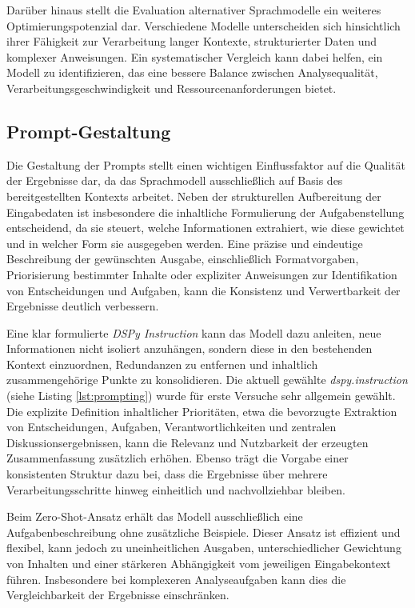Darüber hinaus stellt die Evaluation alternativer Sprachmodelle ein weiteres Optimierungspotenzial dar. Verschiedene Modelle unterscheiden sich hinsichtlich ihrer Fähigkeit zur Verarbeitung langer Kontexte, strukturierter Daten und komplexer Anweisungen. Ein systematischer Vergleich kann dabei helfen, ein Modell zu identifizieren, das eine bessere Balance zwischen Analysequalität, Verarbeitungsgeschwindigkeit und Ressourcenanforderungen bietet.

\newpage
\subsection{Prompt-Gestaltung}
Die Gestaltung der Prompts stellt einen wichtigen Einflussfaktor auf die Qualität der Ergebnisse dar, da das Sprachmodell ausschließlich auf Basis des bereitgestellten Kontexts arbeitet. Neben der strukturellen Aufbereitung der Eingabedaten ist insbesondere die inhaltliche Formulierung der Aufgabenstellung entscheidend, da sie steuert, welche Informationen extrahiert, wie diese gewichtet und in welcher Form sie ausgegeben werden. Eine präzise und eindeutige Beschreibung der gewünschten Ausgabe, einschließlich Formatvorgaben, Priorisierung bestimmter Inhalte oder expliziter Anweisungen zur Identifikation von Entscheidungen und Aufgaben, kann die Konsistenz und Verwertbarkeit der Ergebnisse deutlich verbessern.

Eine klar formulierte \textit{DSPy Instruction} kann das Modell dazu anleiten, neue Informationen nicht isoliert anzuhängen, sondern diese in den bestehenden Kontext einzuordnen, Redundanzen zu entfernen und inhaltlich zusammengehörige Punkte zu konsolidieren. Die aktuell gewählte \textit{dspy.instruction} (siehe Listing \ref{lst:prompting}) wurde für erste Versuche sehr allgemein gewählt. Die explizite Definition inhaltlicher Prioritäten, etwa die bevorzugte Extraktion von Entscheidungen, Aufgaben, Verantwortlichkeiten und zentralen Diskussionsergebnissen, kann die Relevanz und Nutzbarkeit der erzeugten Zusammenfassung zusätzlich erhöhen. Ebenso trägt die Vorgabe einer konsistenten Struktur dazu bei, dass die Ergebnisse über mehrere Verarbeitungsschritte hinweg einheitlich und nachvollziehbar bleiben.

Beim Zero-Shot-Ansatz erhält das Modell ausschließlich eine Aufgabenbeschreibung ohne zusätzliche Beispiele. Dieser Ansatz ist effizient und flexibel, kann jedoch zu uneinheitlichen Ausgaben, unterschiedlicher Gewichtung von Inhalten und einer stärkeren Abhängigkeit vom jeweiligen Eingabekontext führen. Insbesondere bei komplexeren Analyseaufgaben kann dies die Vergleichbarkeit der Ergebnisse einschränken.

